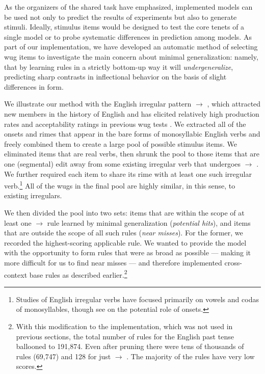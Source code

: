\documentclass[11pt]{article}
\begin{document}
As the organizers of the shared task have emphasized, implemented models can be used not only to predict the results of experiments but also to generate stimuli. Ideally, stimulus items would be designed to test the core tenets of a single model or to probe systematic differences in prediction among models. As part of our implementation, we have developed an automatic method of selecting wug items to investigate the main concern about minimal generalization: namely, that by learning rules in a strictly bottom-up way it will \emph{undergeneralize}, predicting sharp contrasts in inflectional behavior on the basis of slight differences in form.

We illustrate our method with the English irregular pattern  $\to$ , which attracted new members in the history of English and has elicited relatively high production rates and acceptability ratings in previous wug tests \citep[\emph{e.g.},][]{bybee1983, albright2003}. We extracted all of the onsets and rimes that appear in the bare forms of monosyllabic English verbs and freely combined them to create a large pool of possible stimulus items. We eliminated items that are real verbs, then shrunk the pool to those items that are one (segmental) edit away from some existing irregular verb that undergoes  $\to$ . We further required each item to share its rime with at least one such irregular verb.\footnote{Studies of English irregular verbs have focused primarily on vowels and codas of monosyllables, though see \citet{bybee1983} on the potential role of onsets.}  All of the wugs in the final pool are highly similar, in this sense, to existing irregulars.

We then divided the pool into two sets: items that are within the scope of at least one  $\to$  rule learned by minimal generalization (\emph{potential hits}), and items that are outside the scope of all such rules (\emph{near misses}). For the former, we recorded the highest-scoring applicable rule. We wanted to provide the model with the opportunity to form rules that were as broad as possible --- making it more difficult for us to find near misses --- and therefore implemented cross-context base rules as described earlier.\footnote{With this modification to the implementation, which was not used in previous sections, the total number of rules for the English past tense ballooned to 191,874. Even after pruning there were tens of thousands of rules (69,747) and 128 for just  $\to$ . The majority of the rules have very low scores.}
\end{document}
